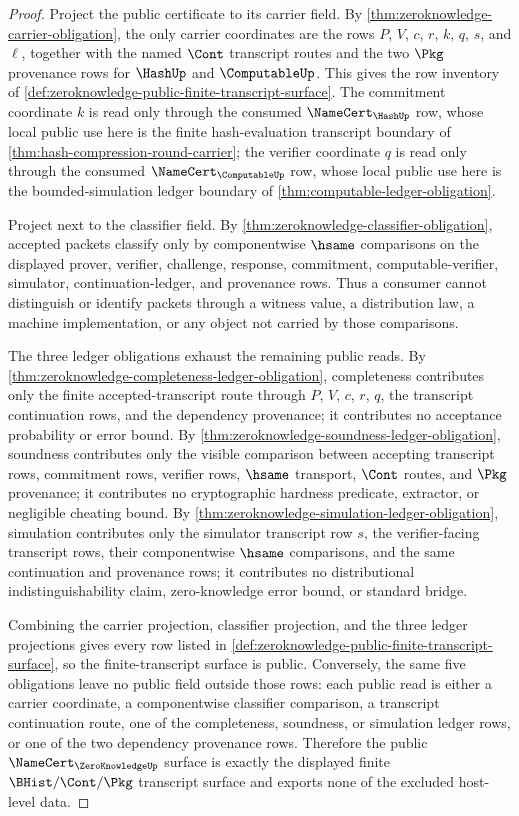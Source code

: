 \begin{proof}
Project the public certificate to its carrier field. By \autoref{thm:zeroknowledge-carrier-obligation}, the only carrier coordinates are the rows $P$, $V$, $c$, $r$, $k$, $q$, $s$, and $\ell$, together with the named $\Cont$ transcript routes and the two $\Pkg$ provenance rows for $\HashUp$ and $\ComputableUp$. This gives the row inventory of \autoref{def:zeroknowledge-public-finite-transcript-surface}. The commitment coordinate $k$ is read only through the consumed $\NameCert_{\HashUp}$ row, whose local public use here is the finite hash-evaluation transcript boundary of \autoref{thm:hash-compression-round-carrier}; the verifier coordinate $q$ is read only through the consumed $\NameCert_{\ComputableUp}$ row, whose local public use here is the bounded-simulation ledger boundary of \autoref{thm:computable-ledger-obligation}.

Project next to the classifier field. By \autoref{thm:zeroknowledge-classifier-obligation}, accepted packets classify only by componentwise $\hsame$ comparisons on the displayed prover, verifier, challenge, response, commitment, computable-verifier, simulator, continuation-ledger, and provenance rows. Thus a consumer cannot distinguish or identify packets through a witness value, a distribution law, a machine implementation, or any object not carried by those comparisons.

The three ledger obligations exhaust the remaining public reads. By \autoref{thm:zeroknowledge-completeness-ledger-obligation}, completeness contributes only the finite accepted-transcript route through $P$, $V$, $c$, $r$, $q$, the transcript continuation rows, and the dependency provenance; it contributes no acceptance probability or error bound. By \autoref{thm:zeroknowledge-soundness-ledger-obligation}, soundness contributes only the visible comparison between accepting transcript rows, commitment rows, verifier rows, $\hsame$ transport, $\Cont$ routes, and $\Pkg$ provenance; it contributes no cryptographic hardness predicate, extractor, or negligible cheating bound. By \autoref{thm:zeroknowledge-simulation-ledger-obligation}, simulation contributes only the simulator transcript row $s$, the verifier-facing transcript rows, their componentwise $\hsame$ comparisons, and the same continuation and provenance rows; it contributes no distributional indistinguishability claim, zero-knowledge error bound, or standard bridge.

Combining the carrier projection, classifier projection, and the three ledger projections gives every row listed in \autoref{def:zeroknowledge-public-finite-transcript-surface}, so the finite-transcript surface is public. Conversely, the same five obligations leave no public field outside those rows: each public read is either a carrier coordinate, a componentwise classifier comparison, a transcript continuation route, one of the completeness, soundness, or simulation ledger rows, or one of the two dependency provenance rows. Therefore the public $\NameCert_{\ZeroKnowledgeUp}$ surface is exactly the displayed finite $\BHist/\Cont/\Pkg$ transcript surface and exports none of the excluded host-level data.
\end{proof}

